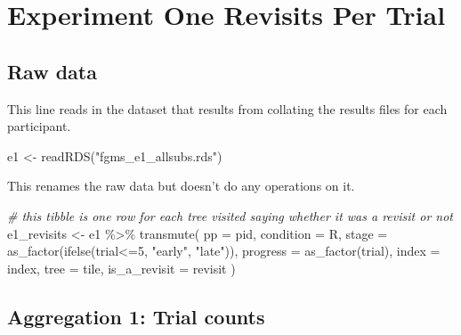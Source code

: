 \documentclass[
]{book}
\newenvironment{Shaded}{\begin{snugshade}}{\end{snugshade}}
\newcommand{\AttributeTok}[1]{\textcolor[rgb]{0.77,0.63,0.00}{#1}}
\newcommand{\CommentTok}[1]{\textcolor[rgb]{0.56,0.35,0.01}{\textit{#1}}}
\newcommand{\DecValTok}[1]{\textcolor[rgb]{0.00,0.00,0.81}{#1}}
\newcommand{\FunctionTok}[1]{\textcolor[rgb]{0.00,0.00,0.00}{#1}}
\newcommand{\NormalTok}[1]{#1}
\newcommand{\OtherTok}[1]{\textcolor[rgb]{0.56,0.35,0.01}{#1}}
\newcommand{\SpecialCharTok}[1]{\textcolor[rgb]{0.00,0.00,0.00}{#1}}
\newcommand{\StringTok}[1]{\textcolor[rgb]{0.31,0.60,0.02}{#1}}
\begin{document}
\hypertarget{experiment-one-revisits-per-trial}{%
\chapter{Experiment One Revisits Per Trial}\label{experiment-one-revisits-per-trial}}

\hypertarget{raw-data}{%
\section{Raw data}\label{raw-data}}

This line reads in the dataset that results from collating the results files for each participant.

\begin{Shaded}
\begin{Highlighting}[]
\NormalTok{e1 }\OtherTok{\textless{}{-}} \FunctionTok{readRDS}\NormalTok{(}\StringTok{"fgms\_e1\_allsubs.rds"}\NormalTok{)}
\end{Highlighting}
\end{Shaded}

This renames the raw data but doesn't do any operations on it.

\begin{Shaded}
\begin{Highlighting}[]
\CommentTok{\# this tibble is one row for each tree visited saying whether it was a revisit or not}
\NormalTok{e1\_revisits }\OtherTok{\textless{}{-}}
\NormalTok{  e1 }\SpecialCharTok{\%\textgreater{}\%}
  \FunctionTok{transmute}\NormalTok{(}
    \AttributeTok{pp           =}\NormalTok{ pid,}
    \AttributeTok{condition    =}\NormalTok{ R,}
    \AttributeTok{stage        =} \FunctionTok{as\_factor}\NormalTok{(}\FunctionTok{ifelse}\NormalTok{(trial}\SpecialCharTok{\textless{}=}\DecValTok{5}\NormalTok{, }\StringTok{"early"}\NormalTok{, }\StringTok{"late"}\NormalTok{)),}
    \AttributeTok{progress     =} \FunctionTok{as\_factor}\NormalTok{(trial),}
    \AttributeTok{index        =}\NormalTok{ index,}
    \AttributeTok{tree         =}\NormalTok{ tile,}
    \AttributeTok{is\_a\_revisit =}\NormalTok{ revisit}
\NormalTok{  )}
\end{Highlighting}
\end{Shaded}

\hypertarget{aggregation-1-trial-counts}{%
\section{Aggregation 1: Trial counts}\label{aggregation-1-trial-counts}}
\end{document}
